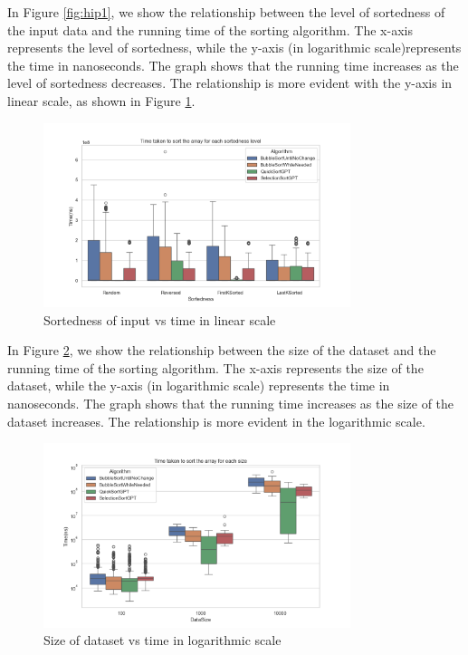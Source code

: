 \documentclass[unicode,11pt,a4paper,oneside,numbers=endperiod,openany]{scrartcl}
\begin{document}
    In Figure \ref{fig:hip1}, we show the relationship between the level of sortedness of the input data and the running time of the sorting algorithm. The x-axis represents the level of sortedness, while the y-axis (in logarithmic scale)represents the time in nanoseconds. The graph shows that the running time increases as the level of sortedness decreases. The relationship is more evident with the y-axis in linear scale, as shown in Figure \ref{fig:hip1_linear}.\\
    \hfill

    \begin{figure}[htbp]
        \centering
        \includegraphics[width=0.8\textwidth]{./fig/hip1-nonLog.png}
        \caption{Sortedness of input vs time in linear scale}
        \label{fig:hip1_linear}
    \end{figure}

    In Figure \ref{fig:hip2}, we show the relationship between the size of the dataset and the running time of the sorting algorithm. The x-axis represents the size of the dataset, while the y-axis (in logarithmic scale) represents the time in nanoseconds. The graph shows that the running time increases as the size of the dataset increases. The relationship is more evident in the logarithmic scale.\\
\hfill



\begin{figure}[htbp]
    \centering
    \includegraphics[width=0.8\textwidth]{./fig/hip2.png}
    \caption{Size of dataset vs time in logarithmic scale}
    \label{fig:hip2}
\end{figure}
\end{document}
